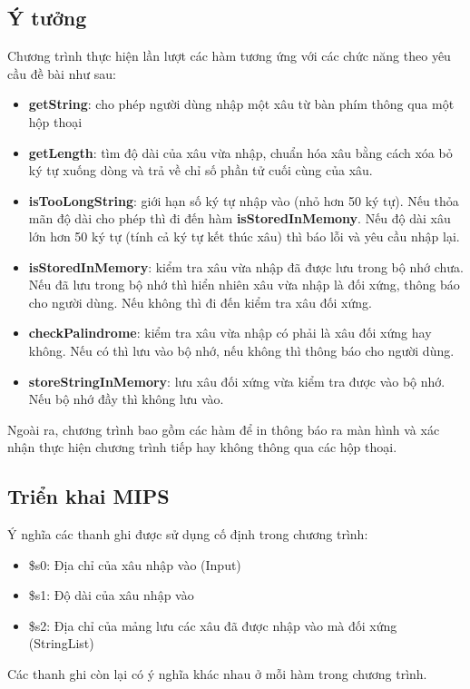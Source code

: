 \documentclass[a4paper,12pt]{article}
\begin{document}
\subsection{Ý tưởng}
Chương trình thực hiện lần lượt các hàm tương ứng với các chức năng theo yêu cầu đề bài như sau:
\begin{itemize}
    \item \textbf{getString}: cho phép người dùng nhập một xâu từ bàn phím thông qua một hộp thoại
    \item \textbf{getLength}: tìm độ dài của xâu vừa nhập, chuẩn hóa xâu bằng cách xóa bỏ ký tự xuống dòng và trả về chỉ số phần tử cuối cùng của xâu.
    \item \textbf{isTooLongString}: giới hạn số ký tự nhập vào (nhỏ hơn 50 ký tự). Nếu thỏa mãn độ dài cho phép thì đi đến hàm \textbf{isStoredInMemony}. Nếu độ dài xâu lớn hơn 50 ký tự (tính cả ký tự kết thúc xâu) thì báo lỗi và yêu cầu nhập lại. 
    \item \textbf{isStoredInMemory}: kiểm tra xâu vừa nhập đã được lưu trong bộ nhớ chưa. Nếu đã lưu trong bộ nhớ thì hiển nhiên xâu vừa nhập là đối xứng, thông báo cho người dùng. Nếu không thì đi đến kiểm tra xâu đối xứng.
    \item \textbf{checkPalindrome}: kiểm tra xâu vừa nhập có phải là xâu đối xứng hay không. Nếu có thì lưu vào bộ nhớ, nếu không thì thông báo cho người dùng.
    \item \textbf{storeStringInMemory}: lưu xâu đối xứng vừa kiểm tra được vào bộ nhớ. Nếu bộ nhớ đầy thì không lưu vào.
\end{itemize}
Ngoài ra, chương trình bao gồm các hàm để in thông báo ra màn hình và xác nhận thực hiện chương trình tiếp hay không thông qua các hộp thoại.
\clearpage
\subsection{Triển khai MIPS}
Ý nghĩa các thanh ghi được sử dụng cố định trong chương trình:
\begin{itemize}
    \item \$s0: Địa chỉ của xâu nhập vào (Input)
    \item \$s1: Độ dài của xâu nhập vào 
    \item \$s2: Địa chỉ của mảng lưu các xâu đã được nhập vào mà đối xứng (StringList)
\end{itemize}
Các thanh ghi còn lại có ý nghĩa khác nhau ở mỗi hàm trong chương trình.
\end{document}
